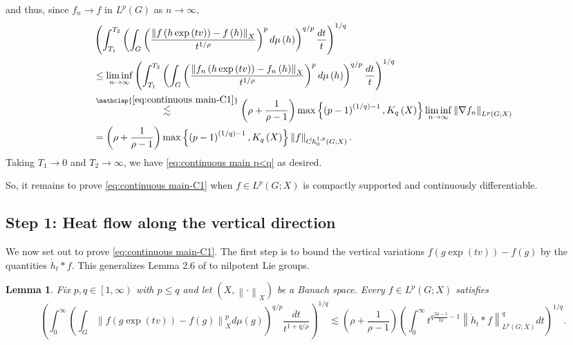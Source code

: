 \documentclass[11pt,reqno]{amsart}
\newtheorem{lemma}[theorem]{Lemma}
\newcommand{\1}{\mathbf 1}
\begin{document}
and thus, since $f_n\to f$ in $L^p\left(G\right)$ as $n\to \infty$,
\begin{align*}
&\left(\int_{T_1}^{T_2} \left(\int_{G}\left(\frac{\left\|f\left(h\exp\left(tv\right)\right)-f\left(h\right)\right\|_X}{t^{1/\rho}}\right)^pd\mu\left(h\right)\right)^{q/p}\frac{dt}{t}\right)^{1/q}\\
&\le
\liminf_{n\to\infty}\left(\int_{T_1}^{T_2} \left(\int_{G}\left(\frac{\left\|f_n\left(h\exp\left(tv\right)\right)-f_n\left(h\right)\right\|_X}{t^{1/\rho}}\right)^pd\mu\left(h\right)\right)^{q/p}\frac{dt}{t}\right)^{1/q}\\
&\stackrel{\mathclap{\eqref{eq:continuous main-C1}}}{\lesssim}  \left(\rho+\frac{1}{\rho-1}\right)\max\left\{\left(p-1\right)^{(1/q)-1},K_q\left(X\right)\right\} \liminf_{n\to\infty}\left\|\nabla f_n\right\|_{L^p\left(G;X\right)}\\
&=\left(\rho+\frac{1}{\rho-1}\right)\max\left\{\left(p-1\right)^{(1/q)-1},K_q\left(X\right)\right\} \left\|f\right\|_{\dot{Ch}_0^{1,p}\left(G;X\right)}.
\end{align*}
Taking $T_1\to 0$ and $T_2\to\infty$, we have \eqref{eq:continuous main p<q} as desired.

So, it remains to prove \eqref{eq:continuous main-C1} when $f\in L^p\left(G;X\right)$ is compactly supported and continuously differentiable.

\subsection{Step 1: Heat flow along the vertical direction}\label{subsec:step1}
We now set out to prove \eqref{eq:continuous main-C1}. The first step is to bound the vertical variations $f\left(g\exp\left(tv\right)\right)-f\left(g\right)$ by the quantities $\dot{h}_t*f$. This generalizes Lemma 2.6 of \cite{lafforgue2014vertical} to nilpotent Lie groups.

\begin{lemma}\label{lem:first step}
Fix $p,q\in \left[1,\infty\right)$ with $p\le q$ and let $\left(X,\left\|\cdot\right\|_X\right)$ be a Banach space. Every $f\in L^p\left(G;X\right)$ satisfies
\begin{equation}\label{eq:g function besov}
\left(\int_0^\infty \left(\int_{G}\left\|f\left(g\exp\left(tv\right)\right)-f\left(g\right)\right\|_X^pd\mu\left(g\right)\right)^{q/p}\frac{dt}{t^{1+q/\rho}}\right)^{1/q}\lesssim \left(\rho+\frac{1}{\rho-1}\right)
\left(\int_0^\infty t^{q\frac{2\rho-1}{2\rho}-1}\left\|\dot{h}_t*f\right\|_{L^p\left(G;X\right)}^qdt\right)^{1/q}.
\end{equation}
\end{lemma}
\end{document}
